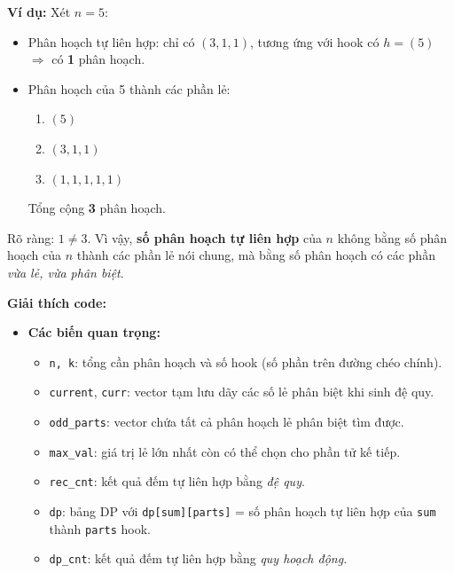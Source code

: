 \documentclass{article}
\begin{document}
\begin{itemize}
    \textbf{Ví dụ:} Xét $n=5$:
    
    \begin{itemize}
        \item Phân hoạch tự liên hợp: chỉ có $(3,1,1)$, tương ứng với hook có $h = (5)$ $\Rightarrow$ có \textbf{1} phân hoạch.
        \item Phân hoạch của 5 thành các phần lẻ:
        \begin{enumerate}
            \item $(5)$
            \item $(3,1,1)$
            \item $(1,1,1,1,1)$
        \end{enumerate}
        Tổng cộng \textbf{3} phân hoạch.
    \end{itemize}

    Rõ ràng: $1 \ne 3$. Vì vậy, \textbf{số phân hoạch tự liên hợp} của $n$ không bằng số phân hoạch của $n$ thành các phần lẻ nói chung, mà bằng số phân hoạch có các phần \emph{vừa lẻ, vừa phân biệt}.
\end{itemize}

\textbf{Giải thích code:}

\begin{itemize}
    \item \textbf{Các biến quan trọng:}
    \begin{itemize}
        \item \texttt{n, k}: tổng cần phân hoạch và số hook (số phần trên đường chéo chính).
        \item \texttt{current}, \texttt{curr}: vector tạm lưu dãy các số lẻ phân biệt khi sinh đệ quy.
        \item \texttt{odd\_parts}: vector chứa tất cả phân hoạch lẻ phân biệt tìm được.
        \item \texttt{max\_val}: giá trị lẻ lớn nhất còn có thể chọn cho phần tử kế tiếp.
        \item \texttt{rec\_cnt}: kết quả đếm tự liên hợp bằng \emph{đệ quy}.
        \item \texttt{dp}: bảng DP với \texttt{dp[sum][parts]} = số phân hoạch tự liên hợp của \texttt{sum} thành \texttt{parts} hook.
        \item \texttt{dp\_cnt}: kết quả đếm tự liên hợp bằng \emph{quy hoạch động}.
    \end{itemize}    
\end{itemize}

\end{document}
